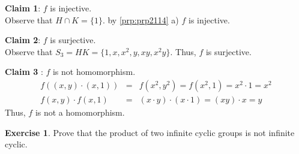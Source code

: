\documentclass[
]{book}
\theoremstyle{definition}
\theoremstyle{definition}
\theoremstyle{definition}
\newtheorem{exercise}{Exercise}[chapter]
\theoremstyle{definition}
\theoremstyle{remark}
\begin{document}
\textbf{Claim 1}: \(f\) is injective.\\
Observe that \(H \cap K=\{1\}\). by \ref{prp:prp2114} a) \(f\) is injective.

\textbf{Claim 2}: \(f\) is surjective.\\
Observe that \(S_3=HK=\{1,x,x^2,y,xy,x^2y\}\). Thus, \(f\) is surjective.

\textbf{Claim 3} : \(f\) is not homomorphism.\\
\begin{eqnarray}
f((x,y)\cdot (x,1))&=& f(x^2,y^2)=f(x^2,1)=x^2\cdot 1=x^2\\
f(x,y)\cdot f(x,1)&=& (x\cdot y)\cdot (x\cdot 1)=(xy)\cdot x=y
\end{eqnarray}
Thus, \(f\) is not a homomorphism.

\begin{exercise}
\protect\hypertarget{exr:unnamed-chunk-85}{}\label{exr:unnamed-chunk-85}Prove that the product of two infinite cyclic groups is not infinite cyclic.
\end{exercise}
\end{document}
